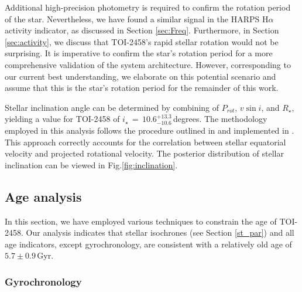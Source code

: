 \documentclass[traditabstract,longauth]{aa}
\begin{document}
Additional high-precision photometry is required to confirm the rotation period of the star. Nevertheless, we have found a similar signal in the HARPS H$\alpha$ activity indicator, as discussed in Section \ref{sec:Freq}. Furthermore, in Section \ref{sec:activity}, we discuss that TOI-2458's rapid stellar rotation would not be surprising. It is imperative to confirm the star's rotation period for a more comprehensive validation of the system architecture. However, corresponding to our current best understanding, we elaborate on this potential scenario and assume that this is the star's rotation period for the remainder of this work.

Stellar inclination angle can be determined by combining of $P_{rot}$, $v \sin{i}$, and $R_\star$, yielding a value for TOI-2458 of $i_\star\,=\,10.6_{-10.6}^{+13.3}$\,degrees. The methodology employed in this analysis follows the procedure outlined in \cite{Masuda20} and implemented in \cite{Bowler23}. This approach correctly accounts for the correlation between stellar equatorial velocity and projected rotational velocity. The posterior distribution of stellar inclination can be viewed in Fig.\ref{fig:inclination}. 

\subsection{Age analysis}\label{sec:age}

In this section, we have employed various techniques to constrain the age of TOI-2458. Our analysis indicates that stellar isochrones (see Section \ref{st_par}) and all age indicators, except gyrochronology, are consistent with a relatively old age of $5.7\pm0.9$\,Gyr.

\subsubsection{Gyrochronology}
\end{document}

